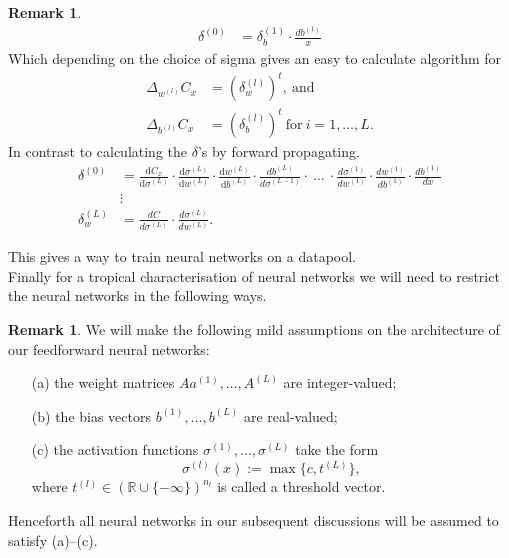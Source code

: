 \documentclass{article}
\theoremstyle{definition}
\newtheorem{remark}[theorem]{Remark}
\begin{document}
\begin{remark}
\begin{align*}
\delta^{(0)} &= \delta^{(1)}_{b} \cdot \frac{d b^{(1)}}{x}
\end{align*}
Which depending on the choice of sigma gives an easy to calculate algorithm for
\begin{align*}
\Delta_{w^{(l)}}C_{x} &= (\delta_{w}^{(l)})^{t}, \ \text{and} \\
\Delta_{b^{(l)}}C_{x} &= (\delta_{b}^{(l)})^{t} \ \text{for} \ i=1,\dots , L.
\end{align*}
In contrast to calculating the $\delta$'s by forward propagating.
\begin{align*}
\delta^{(0)} &= \frac{\mathrm d C_{x}}{\mathrm d \sigma^{(L)}} \cdot \frac{\mathrm d \sigma^{(L)}}{\mathrm d w^{(L)}} \cdot \frac{\mathrm d w^{(L)}}{\mathrm d b^{(L)}} \cdot \frac{d b^{(L)}}{d \sigma^{(L-1)}} \cdot \ \ldots \ \cdot \frac{d \sigma^{(1)}}{d w^{(1)}} \cdot \frac{d w^{(1)}}{d b^{(1)}} \cdot \frac{d b^{(1)}}{dx} \\
&\vdots \\
\delta^{(L)}_{w} &= \frac{d C}{d \sigma^{(L)}} \cdot \frac{d \sigma^{(L)}}{d w^{(L)}}.
\end{align*}

\end{remark}



This gives a way to train neural networks on a datapool. \\

Finally for a tropical characterisation of neural networks we will need to restrict the neural networks in the following ways.

\begin{remark}\cite{zhang2018tropical}
We will make the following mild assumptions
on the architecture of our feedforward neural networks:
\begin{itemize}
\item[(a)]
the weight matrices $Aa^{(1)} , \dots , A^{(L)}$ are integer-valued;
\item[(b)]
the bias vectors $b^{(1)} , \dots , b^{(L)}$ are real-valued;
\item[(c)]
the activation functions $\sigma^{(1)} , \dots , \sigma^{(L)}$ take the form
$$\sigma^{(l)}(x) := \max\{c, t^{(L)}\},$$
where $t^{(l)} \in (\mathbb{R} \cup \{-\infty \})^{n_l}$ is called a threshold vector.
\end{itemize}
Henceforth all neural networks in our subsequent discussions will be assumed to satisfy (a)–(c).
\end{remark}
\end{document}
